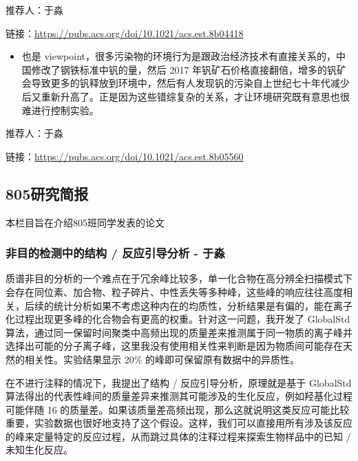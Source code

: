 \documentclass[]{book}
\providecommand{\tightlist}{%
  \setlength{\itemsep}{0pt}\setlength{\parskip}{0pt}}
\begin{document}
推荐人：于淼

链接：\url{https://pubs.acs.org/doi/10.1021/acs.est.8b04418}

\begin{itemize}
\tightlist
\item
  也是 viewpoint，很多污染物的环境行为是跟政治经济技术有直接关系的，中国修改了钢铁标准中钒的量，然后 2017 年钒矿石价格直接翻倍，增多的钒矿会导致更多的钒释放到环境中，然后有人发现钒的污染自上世纪七十年代减少后又重新升高了。正是因为这些错综复杂的关系，才让环境研究既有意思也很难进行控制实验。
\end{itemize}

推荐人：于淼

链接：\url{https://pubs.acs.org/doi/10.1021/acs.est.8b05560}

\hypertarget{ux7814ux7a76ux7b80ux62a5-2}{%
\subsection*{805研究简报}\label{ux7814ux7a76ux7b80ux62a5-2}}

本栏目旨在介绍805班同学发表的论文

\hypertarget{ux975eux76eeux7684ux68c0ux6d4bux4e2dux7684ux7ed3ux6784-ux53cdux5e94ux5f15ux5bfcux5206ux6790---ux4e8eux6dfc}{%
\subsubsection*{非目的检测中的结构 / 反应引导分析 - 于淼}\label{ux975eux76eeux7684ux68c0ux6d4bux4e2dux7684ux7ed3ux6784-ux53cdux5e94ux5f15ux5bfcux5206ux6790---ux4e8eux6dfc}}

质谱非目的分析的一个难点在于冗余峰比较多，单一化合物在高分辨全扫描模式下会存在同位素、加合物、粒子碎片、中性丢失等多种峰，这些峰的响应往往高度相关，后续的统计分析如果不考虑这种内在的均质性，分析结果是有偏的，能在离子化过程出现更多峰的化合物会有更高的权重。针对这一问题，我开发了 GlobalStd 算法，通过同一保留时间聚类中高频出现的质量差来推测属于同一物质的离子峰并选择出可能的分子离子峰，这里我没有使用相关性来判断是因为物质间可能存在天然的相关性。实验结果显示 20\% 的峰即可保留原有数据中的异质性。

在不进行注释的情况下，我提出了结构 / 反应引导分析，原理就是基于 GlobalStd 算法得出的代表性峰间的质量差异来推测其可能涉及的生化反应，例如羟基化过程可能伴随 16 的质量差。如果该质量差高频出现，那么这就说明这类反应可能比较重要，实验数据也很好地支持了这个假设。这样，我们可以直接用所有涉及该反应的峰来定量特定的反应过程，从而跳过具体的注释过程来探索生物样品中的已知 / 未知生化反应。
\end{document}
